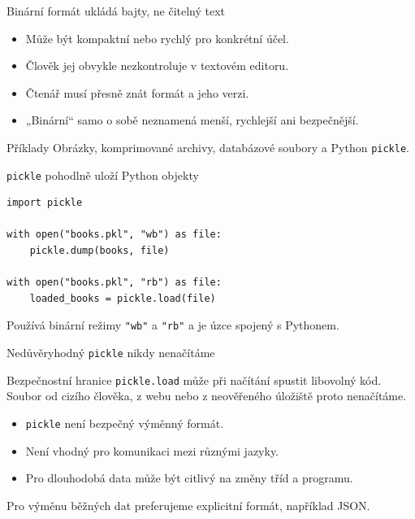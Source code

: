 \documentclass[aspectratio=169]{beamer}
\begin{document}
\begin{frame}{Binární formát ukládá bajty, ne čitelný text}
  \begin{itemize}
    \item Může být kompaktní nebo rychlý pro konkrétní účel.
    \item Člověk jej obvykle nezkontroluje v textovém editoru.
    \item Čtenář musí přesně znát formát a jeho verzi.
    \item „Binární“ samo o sobě neznamená menší, rychlejší ani bezpečnější.
  \end{itemize}
  \begin{block}{Příklady}
    Obrázky, komprimované archivy, databázové soubory a Python \texttt{pickle}.
  \end{block}
\end{frame}

\begin{frame}[fragile]{\texttt{pickle} pohodlně uloží Python objekty}
\begin{lstlisting}[style=python]
import pickle

with open("books.pkl", "wb") as file:
    pickle.dump(books, file)

with open("books.pkl", "rb") as file:
    loaded_books = pickle.load(file)
\end{lstlisting}
  Používá binární režimy \texttt{"wb"} a \texttt{"rb"} a je úzce spojený s Pythonem.
\end{frame}

\begin{frame}{Nedůvěryhodný \texttt{pickle} nikdy nenačítáme}
  \begin{alertblock}{Bezpečnostní hranice}
    \texttt{pickle.load} může při načítání spustit libovolný kód. Soubor od cizího člověka, z webu nebo z neověřeného úložiště proto nenačítáme.
  \end{alertblock}
  \begin{itemize}
    \item \texttt{pickle} není bezpečný výměnný formát.
    \item Není vhodný pro komunikaci mezi různými jazyky.
    \item Pro dlouhodobá data může být citlivý na změny tříd a programu.
  \end{itemize}
  Pro výměnu běžných dat preferujeme explicitní formát, například JSON.
\end{frame}
\end{document}
